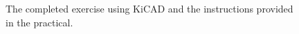 \documentclass[a4paper]{article}
\begin{document}
\begin{figure}[h]
	\centering
	\caption{The completed exercise using KiCAD and the instructions provided in the practical.}
\end{figure}
\end{document}
